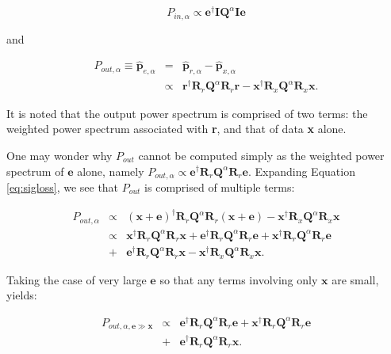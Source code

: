 \documentclass[preprint2,numberedappendix,tighten]{aastex6}  %
\begin{document}
\begin{equation}
\label{eq:Pin}
P_{in,\alpha} \propto \textbf{e}^{\dagger}\textbf{I}\textbf{Q}^{\alpha}\textbf{I}\textbf{e}
\end{equation}

\noindent and

\begin{eqnarray}
\label{eq:sigloss}
P_{out,\alpha} \equiv \hat{\textbf{p}}_{e,\alpha} &=& \hat{\textbf{p}}_{r,\alpha}-\hat{\textbf{p}}_{x,\alpha} \nonumber \\
&\propto& \textbf{r}^{\dagger}\textbf{R}_{r}\textbf{Q}^{\alpha}\textbf{R}_{r}\textbf{r} - \textbf{x}^{\dagger}\textbf{R}_{x}\textbf{Q}^{\alpha}\textbf{R}_{x}\textbf{x}.
\end{eqnarray}

It is noted that the output power spectrum is comprised of two terms: the weighted power spectrum associated with \textbf{r}, and that of data \textbf{x} alone. 

One may wonder why $P_{out}$ cannot be computed simply as the weighted power spectrum of $\textbf{e}$ alone, namely $P_{out,\alpha} \propto \textbf{e}^{\dagger}\textbf{R}_{r}\textbf{Q}^{\alpha}\textbf{R}_{r}\textbf{e}$. Expanding Equation \eqref{eq:sigloss}, we see that $P_{out}$ is comprised of multiple terms:

\begin{eqnarray}
\label{eq:crossterm}
P_{out,\alpha} &\propto& (\textbf{x}+\textbf{e})^{\dagger}\textbf{R}_{r}\textbf{Q}^{\alpha}\textbf{R}_{r}(\textbf{x}+\textbf{e}) - \textbf{x}^{\dagger}\textbf{R}_{x}\textbf{Q}^{\alpha}\textbf{R}_{x}\textbf{x} \nonumber \\
&\propto& \textbf{x}^{\dagger}\textbf{R}_{r}\textbf{Q}^{\alpha}\textbf{R}_{r}\textbf{x} + \textbf{e}^{\dagger}\textbf{R}_{r}\textbf{Q}^{\alpha}\textbf{R}_{r}\textbf{e} + \textbf{x}^{\dagger}\textbf{R}_{r}\textbf{Q}^{\alpha}\textbf{R}_{r}\textbf{e} \nonumber \\
&+& \textbf{e}^{\dagger}\textbf{R}_{r}\textbf{Q}^{\alpha}\textbf{R}_{r}\textbf{x} - \textbf{x}^{\dagger}\textbf{R}_{x}\textbf{Q}^{\alpha}\textbf{R}_{x}\textbf{x}.
\end{eqnarray}

Taking the case of very large $\textbf{e}$ so that any terms involving only $\textbf{x}$ are small, yields:

\begin{eqnarray}
\label{eq:pout_expand}
P_{out, \alpha,\textbf{e} \gg \textbf{x}} &\propto& \textbf{e}^{\dagger}\textbf{R}_{r}\textbf{Q}^{\alpha}\textbf{R}_{r}\textbf{e} + \textbf{x}^{\dagger}\textbf{R}_{r}\textbf{Q}^{\alpha}\textbf{R}_{r}\textbf{e} \nonumber \\
&+& \textbf{e}^{\dagger}\textbf{R}_{r}\textbf{Q}^{\alpha}\textbf{R}_{r}\textbf{x}.
\end{eqnarray}
\end{document}

